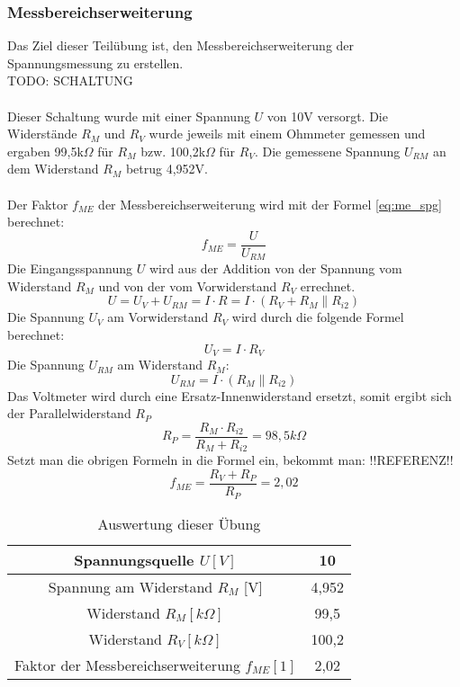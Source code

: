 \subsubsection{Messbereichserweiterung}
Das Ziel dieser Teilübung ist, den Messbereichserweiterung der Spannungsmessung zu erstellen.
~\\
TODO: SCHALTUNG		\\
~\\
Dieser Schaltung wurde mit einer Spannung $U$ von 10V versorgt. Die Widerstände $R_M$ und $R_V$ wurde jeweils mit einem Ohmmeter gemessen und ergaben 99,5k$\Omega$ für $R_M$ bzw. 100,2k$\Omega$ für $R_V$. Die gemessene Spannung $U_{RM}$ an dem Widerstand $R_M$ betrug 4,952V.	\\
~\\
Der Faktor $f_{ME}$ der Messbereichserweiterung wird mit der Formel \ref{eq:me_spg} berechnet:
\begin{equation}
	f_{ME} = \dfrac{U}{U_{RM}}
	\label{eq:me_spg}
\end{equation}
Die Eingangsspannung $U$ wird aus der Addition von der Spannung vom Widerstand $R_M$ und von der vom Vorwiderstand $R_V$ errechnet.
\begin{equation}
	U = U_V + U_{RM} = I \cdot R = I \cdot (R_V + R_M \parallel R_{i2})
\end{equation}
Die Spannung $U_V$ am Vorwiderstand $R_V$ wird durch die folgende Formel berechnet:
\begin{equation}
	U_V = I \cdot R_V
\end{equation}
Die Spannung $U_{RM}$ am Widerstand $R_M$:
\begin{equation}
	U_{RM} = I \cdot (R_M \parallel R_{i2})
\end{equation}
Das Voltmeter wird durch eine Ersatz-Innenwiderstand ersetzt, somit ergibt sich der Parallelwiderstand $R_P$
\begin{equation}
	R_P = \dfrac{R_M \cdot R_{i2}}{R_M + R_{i2}} = 98,5k\Omega
\end{equation}
Setzt man die obrigen Formeln in die Formel ein, bekommt man: !!REFERENZ!!
\begin{equation}
	f_{ME} = \dfrac{R_V + R_P}{R_P} = 2,02
\end{equation}
\begin{table}[h]
	\centering
	\begin{tabular}{|c|c|}
	\hline 
	Spannungsquelle $U [V]$					& 10 		\\ 
	\hline 
	Spannung am Widerstand $R_M$ [V] 			& 4,952	\\ 
	\hline 
	Widerstand $R_M [k\Omega]$ 				& 99,5	\\ 
	\hline 
	Widerstand $R_V [k\Omega]$ 				& 100,2	\\ 
	\hline 
	Faktor der Messbereichserweiterung $f_{ME} [1]$	& 2,02	\\ 
	\hline 
	\end{tabular}
	\caption{Auswertung dieser Übung}
\end{table}

